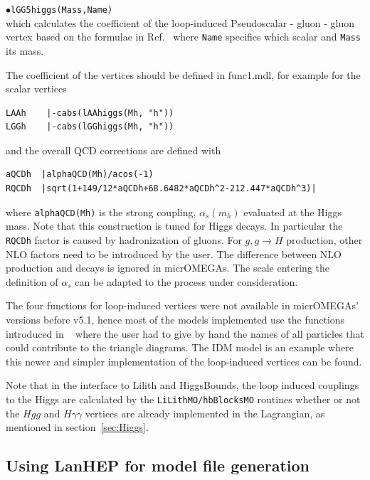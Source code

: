 \documentclass[12pt,a4paper]{article}
\begin{document}
\noindent
$\bullet$\verb|lGG5higgs(Mass,Name)|\\
which calculates the coefficient of the loop-induced  Pseudoscalar - gluon - gluon  vertex based on the formulae in Ref.~\cite{Djouadi:2005gi} where {\tt Name} specifies which scalar and {\tt Mass} its mass. 


The coefficient of the vertices should be defined in func1.mdl, for example for the scalar vertices
 \begin{verbatim}
LAAh    |-cabs(lAAhiggs(Mh, "h"))
LGGh    |-cabs(lGGhiggs(Mh, "h"))
\end{verbatim}
and the overall QCD corrections are defined with 

 \begin{verbatim}
aQCDh  |alphaQCD(Mh)/acos(-1)
RQCDh  |sqrt(1+149/12*aQCDh+68.6482*aQCDh^2-212.447*aQCDh^3)|
\end{verbatim}
where {\tt alphaQCD(Mh)} is the strong coupling, $\alpha_s(m_h)$ evaluated at the Higgs mass. Note that this construction is tuned for  Higgs decays. In particular the   \verb|RQCDh|  factor is caused by hadronization of gluons.   For $g,g\to H$ production, other NLO factors need to be introduced by the user. The difference between NLO production and decays is ignored in micrOMEGAs.  The scale entering the definition of $\alpha_s$ can be adapted to the process under consideration. 

The four functions for loop-induced vertices were not available in micrOMEGAs' versions before v5.1, hence most of the models implemented use the functions introduced in ~\cite{Belanger:2013oya} where the user had to give by hand the names of all particles that could contribute to the triangle diagrams. The IDM model is an example where this newer and simpler implementation of the loop-induced vertices can be found. 

Note that in the interface to Lilith and HiggsBounds, the loop induced couplings to the Higgs  are calculated by the {\tt LiLithMO/hbBlocksMO}  routines whether or not the $Hgg$ and $H\gamma\gamma$ vertices are already implemented in the Lagrangian, as mentioned in section~\ref{sec:Higgs}. 



\subsection{Using LanHEP for model file generation}
\end{document}
